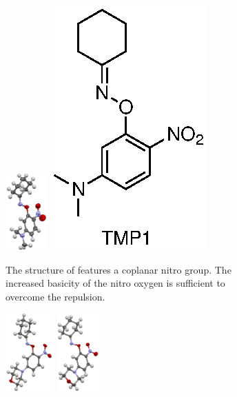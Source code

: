 \begin{refsection}
\begin{figure}
    \centering
    \begin{subfigure}[b]{0.47\linewidth}
        \centering
        \includegraphics[height=3cm]{Figures/cyclohexanone-oxime-2n-5nme2p.pdf}
        \includegraphics[scale=0.74]{Figures/cyclohexanone-oxime-2n-5nme2p.eps}
        \caption[Structure of .]{The structure of  features a coplanar nitro group. The increased basicity of the nitro oxygen is sufficient to overcome the repulsion.}\label{fig:cyclohexanone-oxime-2n.5nme2p}
    \end{subfigure}
    \hfill
    \begin{subfigure}[b]{0.47\linewidth}
        \centering
        \includegraphics[height=3cm]{Figures/cyclohexanone-oxime-2n-5mpa.pdf}
        \includegraphics[height=3cm]{Figures/cyclohexanone-oxime-2n-5mpb.pdf}

\end{subfigure}
\end{figure}
\end{refsection}
